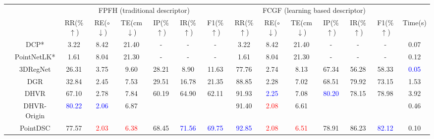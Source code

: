 \begin{table*}[!ht]
	\centering
	\scriptsize
	\renewcommand\tabcolsep{4.0pt}
	\begin{tabular}{cc|cccccc|cccccc|c}%
		
		\hline%
		& & \multicolumn{6}{c|}{FPFH (traditional descriptor)} & \multicolumn{6}{c|}{FCGF (learning based descriptor)} \\ 
		& & RR(\%$\uparrow$) & RE($\circ$$\downarrow$) & TE(cm$\downarrow$) & IP($\%$$\uparrow$) &  IR($\%$$\uparrow$) & F1($\%$$\uparrow$) & RR($\%$$\uparrow$) & RE($\circ$$\downarrow$) & TE(cm$\downarrow$) & IP($\%$$\uparrow$) &  IR($\%$$\uparrow$) & F1($\%$$\uparrow$) & Time(s) \\ \hline
		\multirow{7}{0.04cm}{\rotatebox{90}{learning}} & DCP* \cite{wang2019deep} & 3.22 & 8.42 & 21.40  & - & - & - & 3.22 & 8.42 & 21.40  & - & - & - & 0.07\\
		& PointNetLK* \cite{aoki2019pointnetlk} & 1.61 & 8.04  & 21.30 & - & - & - & 1.61 & 8.04 & 21.30 & - & - & - & 0.12 \\
		& 3DRegNet \cite{pais20203dregnet} & 26.31 & 3.75 & 9.60 & 28.21 & 8.90 & 11.63 & 77.76 & 2.74 & 8.13 & 67.34 & 56.28 & 58.33 & \textcolor{Blue}{0.05}\\
		& DGR \cite{choy2020deep} & 32.84 & 2.45 & 7.53 & 29.51 & 16.78 & 21.35 & 88.85 & 2.28 & 7.02 & 68.51 & 79.92 & 73.15 & 1.53\\
		
		& DHVR \cite{lee2021deep} & 67.10 & 2.78 & 7.84 & 60.19 & 64.90 & 62.11 & 91.93 & \textcolor{Blue}{2.25} & 7.08 & \textcolor{Blue}{80.20} & 78.15 & 78.98 & 3.92\\
		& DHVR-Origin \cite{lee2021deep} & \textcolor{Blue}{80.22} & \textcolor{Blue}{2.06} & 6.87 & & & & 91.40 & \textcolor{Red}{2.08} & 6.61 & & & & 0.46\\
		& PointDSC \cite{bai2021pointdsc} & 77.57 & \textcolor{Red}{2.03} & \textcolor{Red}{6.38} & 68.45 & \textcolor{Blue}{71.56} & \textcolor{Blue}{69.75} & \textcolor{Blue}{92.85} & \textcolor{Red}{2.08} & \textcolor{Red}{6.51} & 78.91 & 86.23 & \textcolor{Blue}{82.12} & 0.10\\ \hline
		

\end{tabular}
\end{table*}
